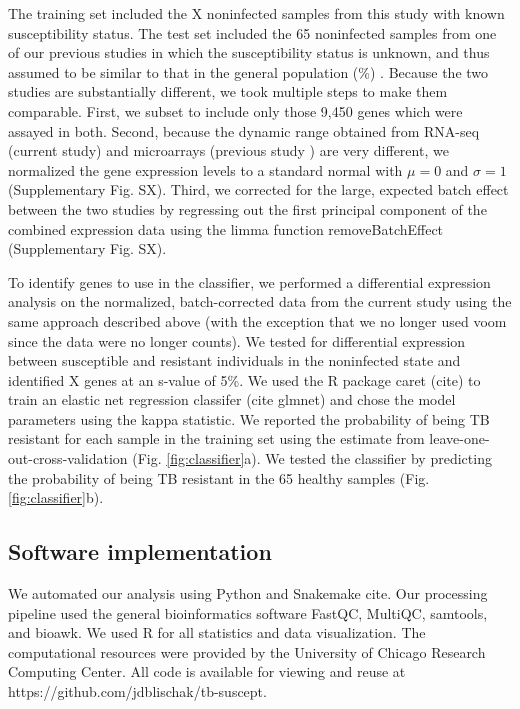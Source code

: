 \documentclass[fleqn,10pt]{wlscirep}
\begin{document}
The training set included the X noninfected samples from this study
with known susceptibility status. The test set included the 65
noninfected samples from one of our previous studies in which the
susceptibility status is unknown, and thus assumed to be similar to
that in the general population (\%)
\cite{Barreiro2012}. Because the two studies are substantially
different, we took multiple steps to make them comparable. First, we
subset to include only those 9,450 genes which were assayed in both.
Second, because the dynamic range obtained from RNA-seq (current
study) and microarrays (previous study \cite{Barreiro2012}) are very
different, we normalized the gene expression levels to a standard
normal with $\mu = 0$ and $\sigma = 1$ (Supplementary Fig. SX). Third,
we corrected for the large, expected batch effect between the two
studies by regressing out the first principal component of the
combined expression data using the limma function removeBatchEffect
\cite{Ritchie2015} (Supplementary Fig. SX).

To identify genes to use in the classifier, we performed a
differential expression analysis on the normalized, batch-corrected
data from the current study using the same approach described above
(with the exception that we no longer used voom since the data were no
longer counts). We tested for differential expression between
susceptible and resistant individuals in the noninfected state and
identified X genes at an s-value of 5\%. We used the R package caret
(cite) to train an elastic net regression classifer (cite glmnet) and
chose the model parameters using the kappa statistic. We reported the
probability of being TB resistant for each sample in the training set
using the estimate from leave-one-out-cross-validation (Fig.
\ref{fig:classifier}a). We tested the classifier by predicting the
probability of being TB resistant in the 65 healthy samples (Fig.
\ref{fig:classifier}b).
\subsection*{Software implementation}

We automated our analysis using Python and Snakemake cite. Our
processing pipeline used the general bioinformatics software FastQC,
MultiQC, samtools, and bioawk. We used R for all statistics and data
visualization. The computational resources were provided by the
University of Chicago Research Computing Center. All code is available
for viewing and reuse at https://github.com/jdblischak/tb-suscept.
\end{document}
